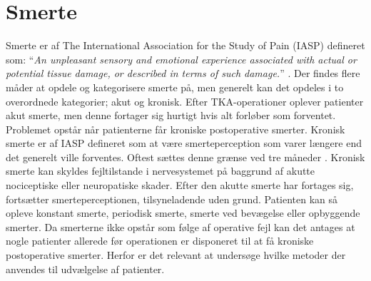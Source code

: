 \section{Smerte}
Smerte er af The International Association for the Study of Pain (IASP) defineret som: “\textit{An unpleasant sensory and emotional experience associated with actual or potential tissue damage, or described in terms of such damage.}” \citep{Carmon}.
Der findes flere måder at opdele og kategorisere smerte på, men generelt kan det opdeles i to overordnede kategorier; akut og kronisk. Efter TKA-operationer oplever patienter akut smerte, men denne fortager sig hurtigt hvis alt forløber som forventet. Problemet opstår når patienterne får kroniske postoperative smerter. Kronisk smerte er af IASP defineret som at være smerteperception som varer længere end det generelt ville forventes. Oftest sættes denne grænse ved tre måneder \citep{Carmon}. Kronisk smerte kan skyldes fejltilstande i nervesystemet på baggrund af akutte nociceptiske eller neuropatiske skader. Efter den akutte smerte har fortages sig, fortsætter smerteperceptionen, tilsyneladende uden grund. Patienten kan så opleve konstant smerte, periodisk smerte, smerte ved bevægelse eller opbyggende smerter. \citep{Giangregorio1997} Da smerterne ikke opstår som følge af operative fejl kan det antages at nogle patienter allerede før operationen er disponeret til at få kroniske postoperative smerter. Herfor er det relevant at undersøge hvilke metoder der anvendes til udvælgelse af patienter.

